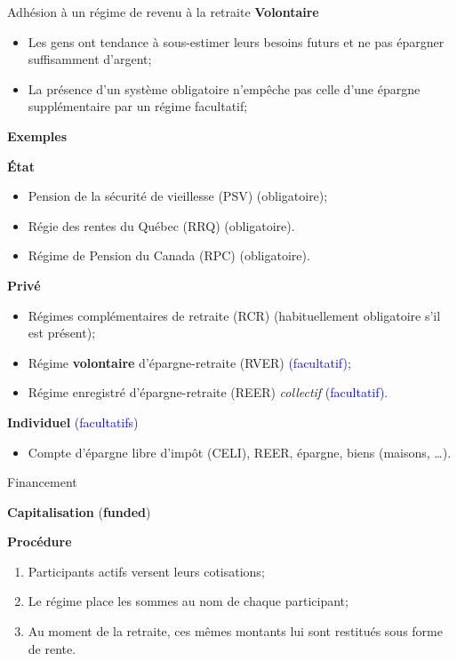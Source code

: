 \documentclass[10pt, french]{article}
\begin{document}
\begin{multicols*}{3}
\begin{conceptgen}{Adhésion à un régime de revenu à la retraite}
\textbf{Volontaire}
\begin{itemize}[leftmargin = *]
	\item	Les gens ont tendance à sous-estimer leurs besoins futurs et ne pas épargner suffisamment d'argent;
	\item	La présence d'un système obligatoire n'empêche pas celle d'une épargne supplémentaire par un régime facultatif;
\end{itemize}

\begin{center}
	\textbf{Exemples}
\end{center}

\textbf{État}
\begin{itemize}[leftmargin = *]
	\item	Pension de la sécurité de vieillesse (PSV) \textcolor{brickred}{(obligatoire)};
	\item	Régie des rentes du Québec (RRQ) \textcolor{brickred}{(obligatoire)}.
	\item	Régime de Pension du Canada (RPC) \textcolor{brickred}{(obligatoire)}.
\end{itemize}
\textbf{Privé}
\begin{itemize}[leftmargin = *]
	\item	Régimes complémentaires de retraite (RCR) \textcolor{brickred}{(habituellement obligatoire s'il est présent)};
	\item	Régime \textbf{volontaire} d'épargne-retraite (RVER) \textcolor{blue}{(facultatif)};
	\item	Régime enregistré d'épargne-retraite (REER) \textit{collectif} \textcolor{blue}{(facultatif)}.
\end{itemize}
\textbf{Individuel} \textcolor{blue}{(facultatifs)}
\begin{itemize}[leftmargin = *]
	\item	Compte d'épargne libre d'impôt (CELI), REER, épargne, biens (maisons, \dots).
\end{itemize}
\end{conceptgen}

\begin{conceptgen}{Financement}
\begin{center}
\textbf{Capitalisation} (\textbf{funded})
\end{center}

\textbf{Procédure}
\begin{enumerate}[leftmargin = *]
	\item	Participants actifs versent leurs cotisations;
	\item	Le régime place les sommes au nom de chaque participant;
	\item	Au moment de la retraite, ces mêmes montants lui sont restitués sous forme de rente.
\end{enumerate}


\end{conceptgen}
\end{multicols*}
\end{document}
